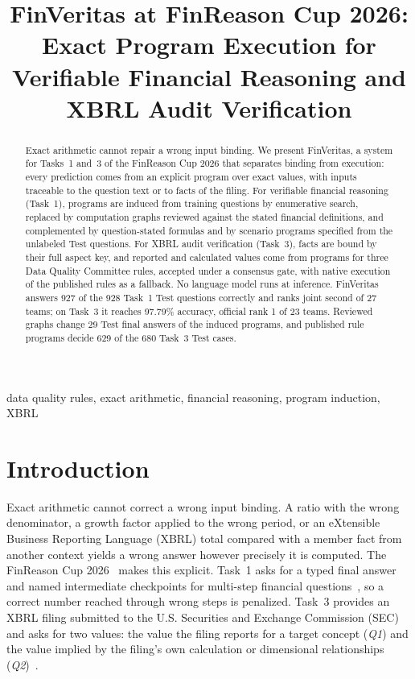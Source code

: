 \documentclass[conference]{IEEEtran}
\title{FinVeritas at FinReason Cup 2026: Exact Program Execution for Verifiable Financial Reasoning and XBRL Audit Verification}
\newcommand{\QA}{\textit{Q1}}
\newcommand{\QB}{\textit{Q2}}
\begin{document}
\maketitle

\begin{abstract}
Exact arithmetic cannot repair a wrong input binding. We present FinVeritas, a system for Tasks~1 and~3 of the FinReason Cup 2026 that separates binding from execution: every prediction comes from an explicit program over exact values, with inputs traceable to the question text or to facts of the filing. For verifiable financial reasoning (Task~1), programs are induced from training questions by enumerative search, replaced by computation graphs reviewed against the stated financial definitions, and complemented by question-stated formulas and by scenario programs specified from the unlabeled Test questions. For XBRL audit verification (Task~3), facts are bound by their full aspect key, and reported and calculated values come from programs for three Data Quality Committee rules, accepted under a consensus gate, with native execution of the published rules as a fallback. No language model runs at inference. FinVeritas answers 927 of the 928 Task~1 Test questions correctly and ranks joint second of 27 teams; on Task~3 it reaches 97.79\% accuracy, official rank 1 of 23 teams. Reviewed graphs change 29 Test final answers of the induced programs, and published rule programs decide 629 of the 680 Task~3 Test cases.
\end{abstract}

\begin{IEEEkeywords}
data quality rules, exact arithmetic, financial reasoning, program induction, XBRL
\end{IEEEkeywords}

\section{Introduction}
Exact arithmetic cannot correct a wrong input binding. A ratio with the wrong denominator, a growth factor applied to the wrong period, or an eXtensible Business Reporting Language (XBRL) total compared with a member fact from another context yields a wrong answer however precisely it is computed. The FinReason Cup 2026~\cite{finreason2026overview} makes this explicit. Task~1 asks for a typed final answer and named intermediate checkpoints for multi-step financial questions~\cite{finreason2026task1overview}, so a correct number reached through wrong steps is penalized. Task~3 provides an XBRL filing submitted to the U.S. Securities and Exchange Commission (SEC) and asks for two values: the value the filing reports for a target concept (\QA{}) and the value implied by the filing's own calculation or dimensional relationships (\QB{})~\cite{finreason2026task3overview}.
\end{document}

